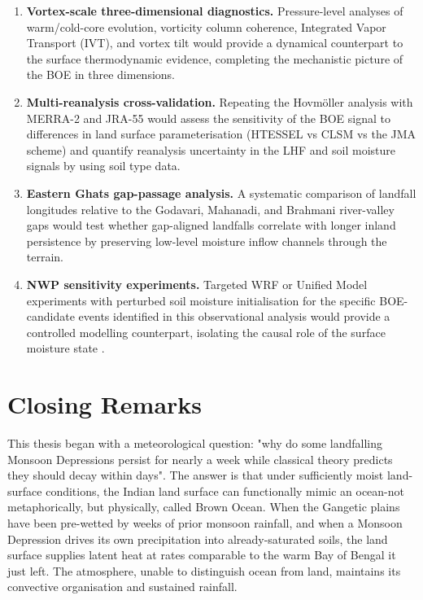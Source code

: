 \begin{enumerate}
  \item \textbf{Vortex-scale three-dimensional diagnostics.}
    Pressure-level analyses of warm/cold-core evolution, vorticity
    column coherence, Integrated Vapor Transport (IVT), and vortex tilt
    would provide a dynamical counterpart to the surface thermodynamic evidence,
    completing the mechanistic picture of the BOE in three dimensions.
  \item \textbf{Multi-reanalysis cross-validation.} Repeating the
    Hovm\"{o}ller analysis with MERRA-2 and JRA-55 would
    assess the sensitivity of the BOE signal to differences in land
    surface parameterisation (HTESSEL vs CLSM vs the JMA scheme) and
    quantify reanalysis uncertainty in the LHF and soil moisture
    signals by using soil type data.
  \item \textbf{Eastern Ghats gap-passage analysis.} A systematic
    comparison of landfall longitudes relative to the Godavari,
    Mahanadi, and Brahmani river-valley gaps would test whether
    gap-aligned landfalls correlate with longer inland persistence by
    preserving low-level moisture inflow channels through the terrain.
  \item \textbf{NWP sensitivity experiments.} Targeted WRF or Unified
    Model experiments with perturbed soil moisture initialisation for
    the specific BOE-candidate events identified in this observational
    analysis would provide a controlled modelling counterpart,
    isolating the causal role of the surface moisture state
    \autocite{hunt2017effect, osuri2020}.
\end{enumerate}

\section{Closing Remarks}
\label{sec:conclusions_closing}

This thesis began with a meteorological question: "why do some landfalling
Monsoon Depressions persist for nearly a week while classical theory predicts
they should decay within days". The answer is that under sufficiently
moist land-surface conditions, the Indian land surface can
functionally mimic an ocean-not metaphorically, but physically,
called Brown Ocean. When the Gangetic plains have been pre-wetted by
weeks of prior monsoon rainfall, and when a Monsoon Depression drives
its own precipitation into already-saturated soils, the land surface
supplies latent heat at rates comparable to the warm Bay of Bengal it
just left. The atmosphere, unable to distinguish ocean from land,
maintains its convective organisation and sustained rainfall.

